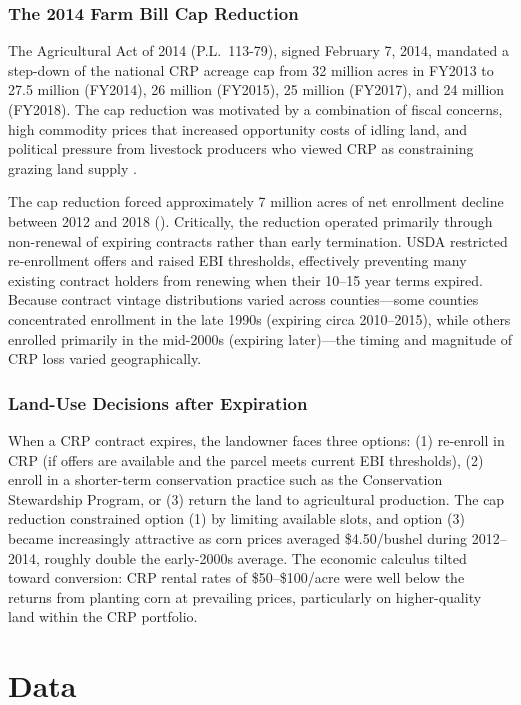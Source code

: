 \documentclass[12pt]{article}
\begin{document}
\subsubsection*{The 2014 Farm Bill Cap Reduction} The Agricultural Act of 2014 (P.L.\ 113-79), signed February 7, 2014, mandated a step-down of the national CRP acreage cap from 32 million acres in FY2013 to 27.5 million (FY2014), 26 million (FY2015), 25 million (FY2017), and 24 million (FY2018). The cap reduction was motivated by a combination of fiscal concerns, high commodity prices that increased opportunity costs of idling land, and political pressure from livestock producers who viewed CRP as constraining grazing land supply \citep{coppess2018conservation}.

The cap reduction forced approximately 7 million acres of net enrollment decline between 2012 and 2018 (). Critically, the reduction operated primarily through non-renewal of expiring contracts rather than early termination. USDA restricted re-enrollment offers and raised EBI thresholds, effectively preventing many existing contract holders from renewing when their 10--15 year terms expired. Because contract vintage distributions varied across counties---some counties concentrated enrollment in the late 1990s (expiring circa 2010--2015), while others enrolled primarily in the mid-2000s (expiring later)---the timing and magnitude of CRP loss varied geographically.

\subsubsection*{Land-Use Decisions after Expiration} When a CRP contract expires, the landowner faces three options: (1) re-enroll in CRP (if offers are available and the parcel meets current EBI thresholds), (2) enroll in a shorter-term conservation practice such as the Conservation Stewardship Program, or (3) return the land to agricultural production. The cap reduction constrained option (1) by limiting available slots, and option (3) became increasingly attractive as corn prices averaged \$4.50/bushel during 2012--2014, roughly double the early-2000s average. The economic calculus tilted toward conversion: CRP rental rates of \$50--\$100/acre were well below the returns from planting corn at prevailing prices, particularly on higher-quality land within the CRP portfolio.

\section{Data}
\end{document}
